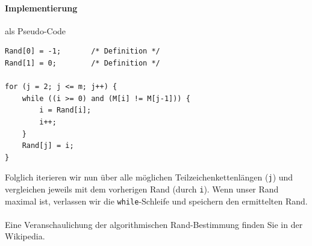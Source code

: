\documentclass[11pt,a4paper]{scrartcl}
\begin{document}
\paragraph{Implementierung} als Pseudo-Code
\begin{lstlisting}
Rand[0] = -1; 		/* Definition */
Rand[1] = 0;		/* Definition */

for (j = 2; j <= m; j++) {
	while ((i >= 0) and (M[i] != M[j-1])) {
		i = Rand[i];
		i++;
	}
	Rand[j] = i;
}
\end{lstlisting}
Folglich iterieren wir nun über alle möglichen Teilzeichenkettenlängen (\texttt{j}) und vergleichen jeweils mit dem vorherigen Rand (durch \texttt{i}). Wenn unser Rand maximal ist, verlassen wir die \texttt{while}-Schleife und speichern den ermittelten Rand. \\\\
Eine Veranschaulichung der algorithmischen Rand-Bestimmung finden Sie in der Wikipedia. \parencite{KMPRand}
\end{document}
